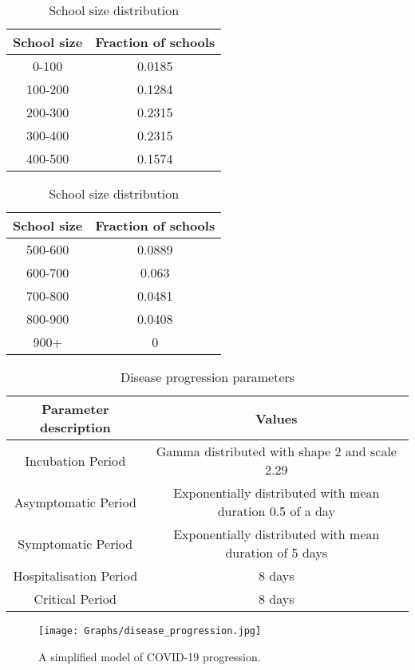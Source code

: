 \documentclass{article}
\theoremstyle{definition}
\begin{document}
\begin{table}
  \centering
    \small
    \caption{School size distribution \label{School size}}
    \begin{tabular}{|c|c|}
      \hline
      {\bf School size} & {\bf Fraction of schools}\\
      \hline
      0-100 & 0.0185\\
      100-200 & 0.1284 \\ 
      200-300 & 0.2315\\
      300-400 & 0.2315 \\ 
      400-500 & 0.1574\\
      \hline
    \end{tabular}
    \quad
     \begin{tabular}{|c|c|}
      \hline
      {\bf School size} & {\bf Fraction of schools}\\
      \hline
      500-600 & 0.0889 \\ 
      600-700 & 0.063\\
      700-800 & 0.0481 \\ 
      800-900 & 0.0408\\
      900+ & 0\\
      \hline
    \end{tabular}
\end{table}
    

  
   


\begin{table}
  \centering
    \small
    \caption{Disease progression parameters \label{Disease Progression}}
    \begin{tabular}{|c|c|}
      \hline
      {\bf Parameter description} & {\bf Values}\\
      \hline
      Incubation Period & Gamma distributed with shape 2 and scale 2.29\\
      Asymptomatic Period & Exponentially distributed with mean duration 0.5 of a day \\ Symptomatic Period &  Exponentially distributed with mean duration of 5 days \\ Hospitalisation Period & 8 days \\ Critical Period & 8 days \\
      \hline
    \end{tabular}
\end{table}


\begin{figure}
      \centering
      
 \texttt{[image: Graphs/disease\_progression.jpg]}
\caption{ A simplified model of COVID-19 progression.}
\label{fig:diseaseProgression}
\end{figure}
\end{document}
